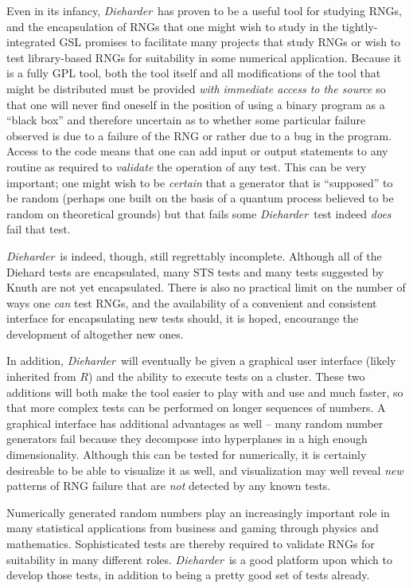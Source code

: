 \documentclass[12pt]{book}
\newcommand{\die}{\emph{Dieharder}\ }
\begin{document}
Even in its infancy, \die has proven to be a useful tool for studying
RNGs, and the encapsulation of RNGs that one might wish to study in the
tightly-integrated GSL promises to facilitate many projects that study
RNGs or wish to test library-based RNGs for suitability in some
numerical application.  Because it is a fully GPL tool, both the tool
itself and all modifications of the tool that might be distributed must
be provided {\em with immediate access to the source} so that one will
never find oneself in the position of using a binary program as a
``black box'' and therefore uncertain as to whether some particular
failure observed is due to a failure of the RNG or rather due to a bug
in the program.  Access to the code means that one can add input or
output statements to any routine as required to {\em validate} the
operation of any test.  This can be very important; one might wish to be
{\em certain} that a generator that is ``supposed'' to be random
(perhaps one built on the basis of a quantum process believed to be
random on theoretical grounds) but that fails some \die test indeed
{\em does} fail that test.

\die is indeed, though, still regrettably incomplete.  Although all of
the Diehard tests are encapsulated, many STS tests and many tests
suggested by Knuth are not yet encapsulated.  There is also no practical
limit on the number of ways one {\em can} test RNGs, and the
availability of a convenient and consistent interface for encapsulating
new tests should, it is hoped, encourange the development of altogether
new ones.

In addition, \die will eventually be given a graphical user interface
(likely inherited from $R$) and the ability to execute tests on a
cluster.  These two additions will both make the tool easier to play
with and use and much faster, so that more complex tests can be
performed on longer sequences of numbers.  A graphical interface has
additional advantages as well -- many random number generators fail
because they decompose into hyperplanes in a high enough dimensionality.
Although this can be tested for numerically, it is certainly desireable
to be able to visualize it as well, and visualization may well reveal
{\em new} patterns of RNG failure that are {\em not} detected by any
known tests.

Numerically generated random numbers play an increasingly important role
in many statistical applications from business and gaming through
physics and mathematics.  Sophisticated tests are thereby required to
validate RNGs for suitability in many different roles.  \die is a good
platform upon which to develop those tests, in addition to being a
pretty good set of tests already.


\end{document}
